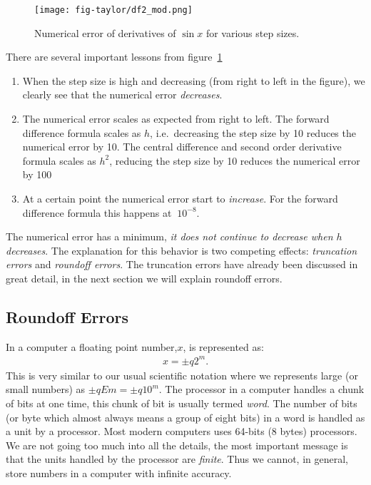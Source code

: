 \documentclass[graybox,sectrefs,envcountresetchap,open=right,final]{svmonodo}
\begin{document}
\begin{figure}[!ht]  %
  \centerline{\texttt{[image: fig-taylor/df2\_mod.png]}}
  \caption{
  Numerical error of derivatives of $\sin x$ for various step sizes. \label{fig:taylor:df2}
  }
\end{figure}

There are several important lessons from figure~\ref{fig:taylor:df2}
\begin{enumerate}
\item When the step size is high and decreasing (from right to left in the figure), we clearly see that the numerical error \emph{decreases}.

\item The numerical error scales as expected from right to left. The forward difference formula scales as $h$, i.e.~decreasing the step size by 10 reduces the numerical error by 10. The central difference and second order derivative formula scales as $h^2$, reducing the step size by 10 reduces the numerical error by 100

\item At a certain point the numerical error start to \emph{increase}. For the forward difference formula this happens at $~10^{-8}$.
\end{enumerate}

\noindent
The numerical error has a minimum, \emph{it does not continue to decrease when $h$ decreases}. The explanation for this behavior is two competing effects: \emph{truncation errors} and \emph{roundoff errors}. The truncation errors have already been discussed in great detail, in the next section we will explain roundoff errors.

\subsection{Roundoff Errors}
In a computer a floating point number,$x$, is represented as:
\begin{align}
x=\pm q2^m.
\label{eq:taylor:sci2}
\end{align}
This is very similar to our usual scientific notation where we represents large (or small numbers) as $\pm q E m=\pm q 10^{m}$. The processor in a computer handles a chunk of bits at one time, this chunk of bit is usually termed \emph{word}. The number of bits (or byte which almost always means a group of eight bits) in a word is handled as a unit by a processor.   
Most modern computers uses 64-bits (8 bytes) processors. We are not going too much into all the details, the most important message is that the units handled by the processor are \emph{finite}. Thus we cannot, in general, store numbers in a computer with infinite accuracy.
\end{document}
